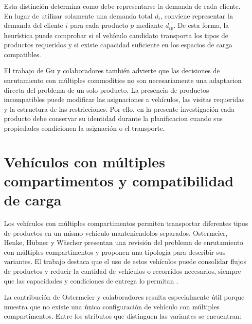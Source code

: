 Esta distinción determina como debe representarse la demanda de cada cliente. En lugar de utilizar solamente una demanda total $d_i$, conviene representar la demanda del cliente $i$ para cada producto $p$ mediante $d_{ip}$. De esta forma, la heurística puede comprobar si el vehículo candidato transporta los tipos de productos requeridos y si existe capacidad suficiente en los espacios de carga compatibles.

El trabajo de Gu y colaboradores también advierte que las decisiones de enrutamiento con múltiples commodities no son necesariamente una adaptacion directa del problema de un solo producto. La presencia de productos incompatibles puede modificar las asignaciones a vehículos, las visitas requeridas y la estructura de las restricciones. Por ello, en la presente investigación cada producto debe conservar su identidad durante la planificacion cuando sus propiedades condicionen la asignación o el transporte.

\section{Vehículos con múltiples compartimentos y compatibilidad de carga}
\label{sec:multi_compartimento}

Los vehículos con múltiples compartimentos permiten transportar diferentes tipos de productos en un mismo vehículo manteniendolos separados. Ostermeier, Henke, Hübner y Wäscher presentan una revisión del problema de enrutamiento con múltiples compartimentos y proponen una tipologia para describir sus variantes. El trabajo destaca que el uso de estos vehículos puede consolidar flujos de productos y reducir la cantidad de vehículos o recorridos necesarios, siempre que las capacidades y condiciones de entrega lo permitan \cite{ostermeier2021}.

La contribución de Ostermeier y colaboradores resulta especialmente útil porque muestra que no existe una única configuración de vehículo con múltiples compartimentos. Entre los atributos que distinguen las variantes se encuentran:

